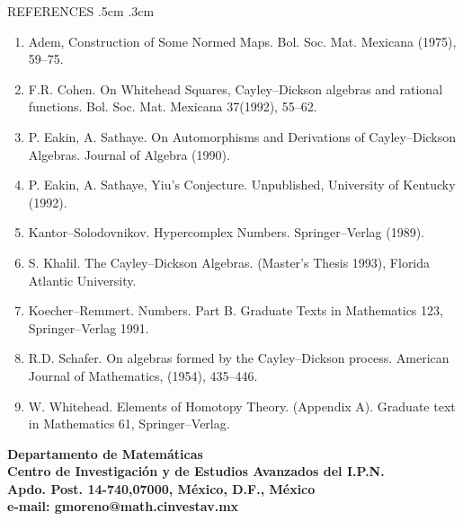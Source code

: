 \noindent
{\bsbf REFERENCES}
\vglue.5cm
\baselineskip.3cm
\begin{enumerate}
\item Adem, Construction of Some Normed Maps. Bol. Soc. Mat. Mexicana 
(1975), 59--75.
\item F.R. Cohen. On Whitehead Squares, Cayley--Dickson algebras and 
rational functions. Bol. Soc. Mat. Mexicana 37(1992), 55--62.
\item P. Eakin, A. Sathaye. On Automorphisms and Derivations of Cayley--Dickson
Algebras. Journal of Algebra (1990).
\item P. Eakin, A. Sathaye, Yiu's Conjecture. Unpublished, University of 
Kentucky (1992).
\item Kantor--Solodovnikov. Hypercomplex Numbers. Springer--Verlag 
(1989).
\item S. Khalil. The Cayley--Dickson Algebras. (Master's Thesis 1993), 
Florida Atlantic University.
\item Koecher--Remmert. Numbers. Part B. Graduate Texts in Mathematics 
123, Springer--Verlag 1991.
\item R.D. Schafer. On algebras formed by the Cayley--Dickson process.
American Journal of Mathematics, (1954), 435--446.
\item W. Whitehead. Elements of Homotopy Theory. (Appendix A). Graduate
text in Mathematics 61, Springer--Verlag.
\end{enumerate}
\bf
Departamento de Matem\'aticas\\
Centro de Investigaci\'on y de Estudios Avanzados del I.P.N. \\
Apdo. Post. 14-740,07000, M\'exico, D.F., M\'exico \\
e-mail: gmoreno@math.cinvestav.mx 


